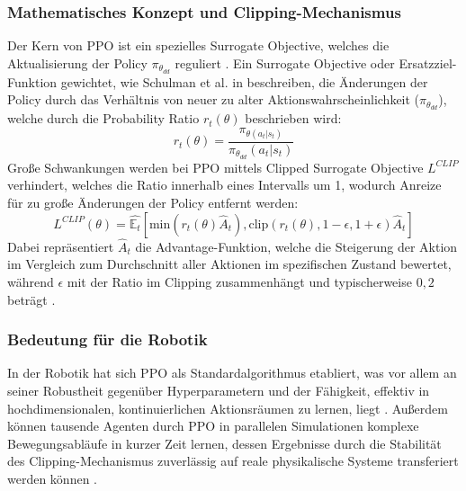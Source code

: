 \subsubsection{Mathematisches Konzept und Clipping-Mechanismus}
Der Kern von PPO ist ein spezielles Surrogate Objective, welches die Aktualisierung der Policy $\pi_{\theta_{dd}}$ reguliert \cite{schulmanProximalPolicyOptimization2017, francois-lavetIntroductionDeepReinforcement2018}. Ein Surrogate Objective oder Ersatzziel-Funktion gewichtet, wie Schulman et al. in \cite{schulmanProximalPolicyOptimization2017} beschreiben, die Änderungen der Policy durch das Verhältnis von neuer zu alter Aktionswahrscheinlichkeit ($\pi_{\theta_{dd}}$), welche durch die Probability Ratio $r_t(\theta)$ beschrieben wird:
\begin{equation}
	r_t(\theta) = \frac{\pi_{\theta(a_t|s_t)}}{\pi_{\theta_{dd}}(a_t|s_t)}
\end{equation}
Große Schwankungen werden bei PPO mittels Clipped Surrogate Objective $L^{CLIP}$ verhindert, welches die Ratio innerhalb eines Intervalls um 1, wodurch Anreize für zu große Änderungen der Policy entfernt werden:
\begin{equation}
	L^{CLIP}(\theta) = \hat{\mathbb{E}_t}[\text{min}(r_t(\theta)\hat{A}_t), \text{clip}(r_t(\theta), 1-\epsilon, 1+\epsilon)\hat{A}_t]
\end{equation} %
Dabei repräsentiert $\hat{A}_t$ die Advantage-Funktion, welche die Steigerung der Aktion im Vergleich zum Durchschnitt aller Aktionen im spezifischen Zustand bewertet, während $\epsilon$ mit der Ratio im Clipping zusammenhängt und typischerweise $0,2$ beträgt \cite{schulmanProximalPolicyOptimization2017}. 
\subsubsection{Bedeutung für die Robotik}
In der Robotik hat sich PPO als Standardalgorithmus etabliert, was vor allem an seiner Robustheit gegenüber Hyperparametern und der Fähigkeit, effektiv in hochdimensionalen, kontinuierlichen Aktionsräumen zu lernen, liegt \cite{tang, schwarke2025rslrllearninglibraryrobotics}. Außerdem können tausende Agenten durch PPO in parallelen Simulationen komplexe Bewegungsabläufe in kurzer Zeit lernen, dessen Ergebnisse durch die Stabilität des Clipping-Mechanismus zuverlässig auf reale physikalische Systeme transferiert werden können \cite{rudin2022learningwalkminutesusing, schwarke2025rslrllearninglibraryrobotics, tangDeepReinforcementLearning2024}.


